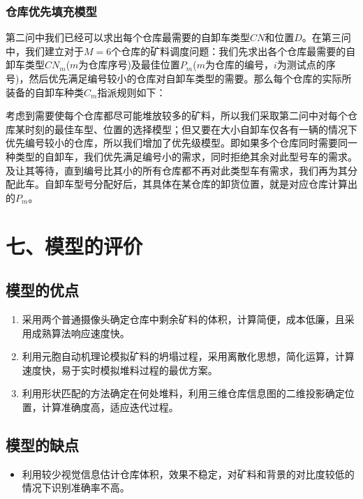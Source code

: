 \documentclass{my_paper}
\begin{document}
\subsubsection{仓库优先填充模型}

第二问中我们已经可以求出每个仓库最需要的自卸车类型$CN$和位置$D$。在第三问中，我们建立对于$M=6$个仓库的矿料调度问题：我们先求出各个仓库最需要的自卸车类型$CN_m$($m$为仓库序号)及最佳位置$P_m$($m$为仓库的编号，$i$为测试点的序号)，然后优先满足编号较小的仓库对自卸车类型的需要。那么每个仓库的实际所装备的自卸车种类$C_m$指派规则如下：

考虑到需要使每个仓库都尽可能堆放较多的矿料，所以我们采取第二问中对每个仓库某时刻的最佳车型、位置的选择模型；但又要在大小自卸车仅各有一辆的情况下优先编号较小的仓库，所以我们增加了优先级模型。即如果多个仓库同时需要同一种类型的自卸车，我们优先满足编号小的需求，同时拒绝其余对此型号车的需求。及让其等待，直到编号比其小的所有仓库都不再对此类型车有需求，我们再为其分配此车。自卸车型号分配好后，其具体在某仓库的卸货位置，就是对应仓库计算出的$P_m$。

\section{七、模型的评价}

\subsection{模型的优点}
\begin{enumerate}
    \item 采用两个普通摄像头确定仓库中剩余矿料的体积，计算简便，成本低廉，且采用成熟算法响应速度快。

    \item 利用元胞自动机理论模拟矿料的坍塌过程，采用离散化思想，简化运算，计算速度快，易于实时模拟堆料过程的最优方案。
    
    \item 利用形状匹配的方法确定在何处堆料，利用三维仓库信息图的二维投影确定位置，计算准确度高，适应迭代过程。
\end{enumerate}

\subsection{模型的缺点}
\begin{itemize}
    \item 利用较少视觉信息估计仓库体积，效果不稳定，对矿料和背景的对比度较低的情况下识别准确率不高。
\end{itemize}
\end{document}

